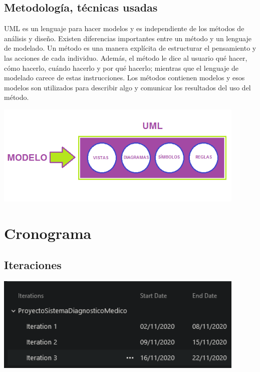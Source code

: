 \documentclass[preprint,12pt]{elsarticle}
\begin{document}
\subsection{\textbf{ Metodología, técnicas usadas  }}
UML es un lenguaje para hacer modelos y es independiente de los métodos de análisis y diseño. Existen diferencias importantes entre un método y un lenguaje de modelado. Un método es una manera explícita de estructurar el pensamiento y las acciones de cada individuo. Además, el método le dice al usuario qué hacer, cómo hacerlo, cuándo hacerlo y por qué hacerlo; mientras que el lenguaje de modelado carece de estas instrucciones. Los métodos contienen modelos y esos modelos son utilizados para describir algo y comunicar los resultados del uso del método.
          \begin{center}
	\includegraphics[width=12cm]{./imagen/5} 
	\end{center}
		
\section{Cronograma }
	
	\subsection{Iteraciones}
	\begin{center}
		\includegraphics[width=12cm]{./imagen/Screenshot_3.png} 
	\end{center}
\end{document}
